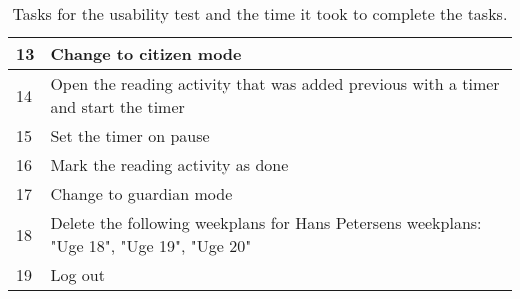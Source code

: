 \begin{table}[H]
\begin{tabular}{|p{1.3cm}|p{12cm}|}
    13 & Change to citizen mode                                                                              \\ \hline
    14 & Open the reading activity that was added previous with a timer and start the timer               \\ \hline
    15 & Set the timer on pause                                                                           \\ \hline
    16 & Mark the reading activity as done                                                                 \\ \hline
    17 & Change to guardian mode                                                                           \\ \hline
    18 & Delete the following weekplans for Hans Petersens weekplans: "Uge 18", "Uge 19", "Uge 20"      \\ \hline
    19 & Log out                                                                                                                                                                                             \\ \hline    \end{tabular}
    \caption{Tasks for the usability test and the time it took to complete the tasks.}\label{table:mette_usability_tasks}
\end{table}

\newpage

